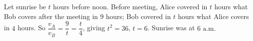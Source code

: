 Let sunrise be $t$ hours before noon. Before meeting, Alice covered in $t$ hours what Bob covers after the meeting in $9$ hours; Bob covered in $t$ hours what Alice covers in $4$ hours. So $\dfrac{v_A}{v_B}=\dfrac9t=\dfrac t4$, giving $t^2=36$, $t=6$. Sunrise was at $\boxed{6\text{ a.m.}}$
